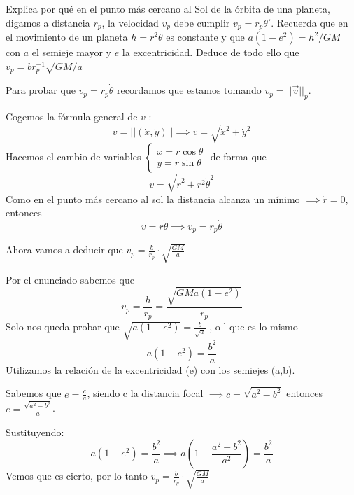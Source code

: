 \begin{problem}[5]
Explica por qué en el punto más cercano al Sol de la órbita de una planeta, digamos a distancia $r_p$, la velocidad $v_p$ debe cumplir $v_p=r_p\theta'$. Recuerda que en el movimiento de un planeta $h=r^2\theta$ es constante y que $a(1-e^2)=h^2/GM$ con $a$ el semieje mayor y  $e$ la excentricidad. Deduce de todo ello que $v_p=br^{-1}_p\sqrt{GM/a}$

\solution
Para probar que $v_p=r_p\dot{\theta}$ recordamos que estamos tomando $v_p = ||\overrightarrow v||_p$.

Cogemos la fórmula general de $v$ : $$ v = ||(\dot{x}, \dot{y})|| \implies v= \sqrt{\dot{x}^2 + \dot{y}^2}$$
Hacemos el cambio de variables
$\begin{cases}
x = r\cos\theta\\
y = r\sin\theta
\end{cases}$ de forma que
$$v = \sqrt{\dot{r}^2 + r^2\dot{\theta}^2}$$
Como en el punto más cercano al sol la distancia alcanza un mínimo $\implies \dot r = 0$, entonces
$$v= r\dot{\theta} \implies v_p = r_p\dot{\theta}$$

Ahora vamos a deducir que $v_p = \frac{b}{r_p}\cdot \sqrt{\frac{GM}{a}}$

Por el enunciado sabemos que
$$v_p = \frac{h}{r_p} = \frac{\sqrt{GMa(1-e^2)}}{r_p}$$
Solo nos queda probar que $\sqrt{a(1-e^2)}= \frac{b}{\sqrt{a}}$ , o l que es lo mismo
$$a(1-e^2) = \frac{b^2}{a}$$
Utilizamos la relación de la excentricidad (e) con los semiejes (a,b).

Sabemos que $e = \frac{c}{a}$, siendo c la distancia focal $\implies c= \sqrt{a^2-b^2}$ entonces $e = \frac{\sqrt{a^2 - b^2}}{a}$.

Sustituyendo:
$$a(1-e^2) = \frac{b^2}{a} \implies a(1-\frac{a^2 - b^2}{a^2}) = \frac{b^2}{a}$$
Vemos que es cierto, por lo tanto $v_p = \frac{b}{r_p}\cdot \sqrt{\frac{GM}{a}}$
\end{problem}

